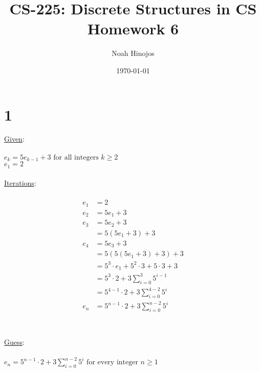 \documentclass[12pt]{article}
\title{
  \textbf{CS-225: Discrete Structures in CS} \\
  Homework 6
  }
\author{Noah Hinojos}
\date{\today}
\begin{document}
\maketitle

\newpage
\section*{1}
\underline{Given}:
\\ \\
$e_k = 5e_{k-1} + 3 \text{ for all integers } k \geq 2$ \\
$e_1 = 2$
\\ \\
\underline{Iterations}:
\\ \\
\begin{align*}
  e_1 &= 2 \\
  e_2 &= 5e_1 + 3 \\
  e_3 &= 5e_2 + 3 \\
  &= 5(5e_1 + 3) + 3 \\
  e_4 &= 5e_3 + 3\\
  &= 5(5(5e_1 + 3) + 3) + 3\\
  &= 5^3\cdot e_1 + 5^2\cdot3 + 5\cdot 3 + 3 \\
  &= 5^{3}\cdot 2 + 3\sum_{i=0}^{3}5^{i-1} \\
  &= 5^{4-1}\cdot 2 + 3\sum_{i=0}^{4-2}5^{i} \\
  e_n &= 5^{n-1}\cdot 2 + 3\sum_{i=0}^{n-2}5^{i} \\
\end{align*}
\\ \\
\underline{Guess}:
\\ \\
$e_n = 5^{n-1}\cdot 2 + 3\sum_{i=0}^{n-2}5^{i} \text{ for every integer }n \geq 1$


\newpage
\end{document}
